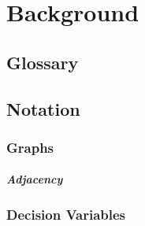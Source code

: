 \chapter{Background}

\section{Glossary}

\section{Notation}
\label{chap:BG}
\subsection{Graphs}

\paragraph{Adjacency}
\subsection{Decision Variables}

